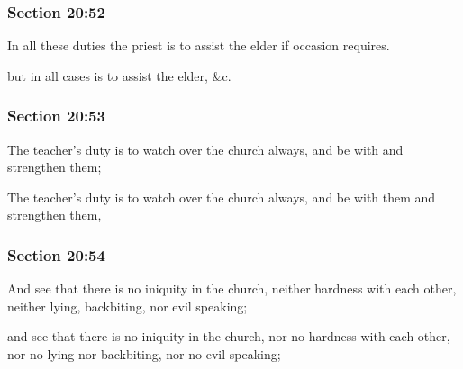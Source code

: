 	\subsubsection{Section 20:52} %
		\label{DC20-52}

		In all these duties the priest is to assist the elder if occasion requires.

		\begin{framed}
		\scriptsize
			\begin{compactdesc}
				\item[JSP] but in all cases is to assist the elder, \&c. 
				\item[RB1] 
				\item[BC] 
			\end{compactdesc}
		\end{framed}

	\subsubsection{Section 20:53} %
		\label{DC20-53}

		The teacher's duty is to watch over the church always, and be with and strengthen them;

		\begin{framed}
		\scriptsize
			\begin{compactdesc}
				\item[JSP] The teacher's duty is to watch over the church always, and be with them and strengthen them, 
				\item[RB1] 
				\item[BC] 
			\end{compactdesc}
		\end{framed}

	\subsubsection{Section 20:54} %
		\label{DC20-54}

		And see that there is no iniquity in the church, neither hardness with each other, neither lying, backbiting, nor evil speaking;

		\begin{framed}
		\scriptsize
			\begin{compactdesc}
				\item[JSP] and see that there is no iniquity in the church, nor no hardness with each other, nor no lying nor backbiting, nor no evil speaking; 
				\item[RB1] 
				\item[BC] 
			\end{compactdesc}
		\end{framed}

